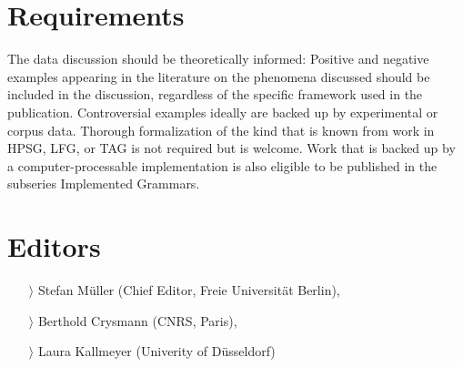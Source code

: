 \documentclass[
notumble,
nofoldmark,
]{leaflet}
\begin{document}
 
{
    \section{Requirements}   
\footnotesize
The data discussion should be theoretically informed: Positive and negative examples appearing in the literature on the phenomena discussed should be included in the discussion, regardless of the specific framework used in the publication. Controversial examples ideally are backed up by experimental or corpus data.
Thorough formalization of the kind that is known from work in HPSG, LFG, or TAG is not required but is welcome. Work that is backed up by a computer-processable implementation is also eligible to be published in the subseries Implemented Grammars.

    \section{Editors}   
    \begin{itemize}
    \item[$\rangle$] Stefan M\"uller (Chief Editor, Freie Universit\"at Berlin), 
    \item[$\rangle$] Berthold Crysmann (CNRS, Paris),
    \item[$\rangle$] Laura Kallmeyer (Univerity of D\"usseldorf)
\end{itemize}
}
\end{document}
